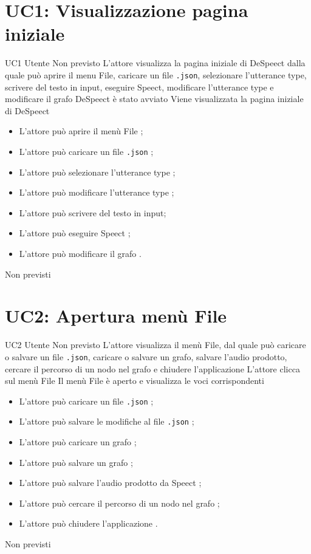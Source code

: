 \documentclass[../AnalisideiRequisiti.tex]{subfiles}
\begin{document}
	\section{UC1: Visualizzazione pagina iniziale} 
		
	\UserCase
	{UC1}
	{Utente}
	{Non previsto}
	{L'attore visualizza la pagina iniziale di DeSpeect dalla quale può aprire il menu File, caricare un file \verb|.json|, selezionare l'utterance type, scrivere del testo in input, eseguire Speect, modificare l'utterance type e modificare il grafo}
	{DeSpeect è stato avviato}
	{Viene visualizzata la pagina iniziale di DeSpeect}
	{\begin{itemize}
			\item{} L'attore può aprire il menù File ;
			\item{} L'attore può caricare un file \verb|.json| ;
			\item{} L'attore può selezionare l'utterance type ;
			\item{} L'attore può modificare l'utterance type ;
			\item{} L'attore può scrivere del testo in input;
			\item{} L'attore può eseguire Speect ;
			\item{} L'attore può modificare il grafo .
	\end{itemize}}
	{Non previsti}
	
	
	\section{UC2: Apertura menù File}

	\UserCase
	{UC2}
	{Utente}
	{Non previsto}
	{L'attore visualizza il menù File, dal quale può caricare o salvare un file \verb|.json|, caricare o salvare un grafo, salvare l'audio prodotto, cercare il percorso di un nodo nel grafo e chiudere l'applicazione}
	{L'attore clicca sul menù File}
	{Il menù File è aperto e visualizza le voci corrispondenti}
	{	\begin{itemize}
		\item{} L'attore può caricare un file \verb|.json| ;
		\item{} L'attore può salvare le modifiche al file \verb|.json| ;
		\item{} L'attore può caricare un grafo ;
		\item{} L'attore può salvare un grafo ;
		\item{} L'attore può salvare l'audio prodotto da Speect ;
		\item{} L'attore può cercare il percorso di un nodo nel grafo ;
		\item{} L'attore può chiudere l'applicazione .
		\end{itemize}
	}
	{Non previsti}
\end{document}
